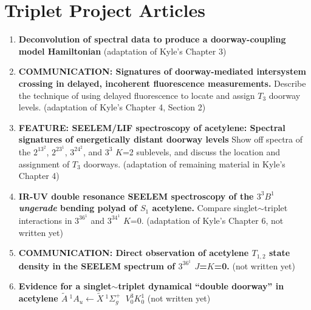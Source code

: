 \documentclass[12pt]{mitthesis}
\begin{document}
\newcommand{\mytitle}[1]{\textbf{#1}}
\newcommand{\AtoX}{$
  \tilde{A} \: ^1\!A_u 
  \leftarrow 
  \tilde{X} \: ^1\Sigma_g^+
  $}
\section*{Triplet Project Articles}
\begin{enumerate}
\item \mytitle{Deconvolution of spectral data to produce a
    doorway-coupling model Hamiltonian} (adaptation of Kyle's Chapter
  3)

\item \mytitle{COMMUNICATION: Signatures of doorway-mediated
    intersystem crossing in delayed, incoherent fluorescence
    measurements.}  Describe the technique of using delayed
  fluorescence to locate and assign $T_3$ doorway levels. (adaptation
  of Kyle's Chapter 4, Section 2)

\item \mytitle{FEATURE: SEELEM/LIF spectroscopy of acetylene: Spectral
    signatures of energetically distant doorway levels}  Show off
  spectra of the $2^13^2$, $2^23^1$, $3^24^2$, and $3^3$ $K$=2
  sublevels, and discuss the location and assignment of $T_3$
  doorways. (adaptation of remaining material in Kyle's Chapter 4)

\item \mytitle{IR-UV double resonance SEELEM spectroscopy of the
    $3^3B^1$ \emph{ungerade} bending polyad of $S_1$ acetylene.}
  Compare singlet$\sim$triplet interactions in $3^36^1$ and $3^34^1$
  $K$=0.  (adaptation of Kyle's Chapter 6, not written yet)

\item \mytitle{COMMUNICATION: Direct observation of acetylene
    $T_{1,2}$ state density in the SEELEM spectrum of $3^36^1$
    $J$=$K$=0.} (not written yet)

\item \mytitle{Evidence for a singlet$\sim$triplet dynamical ``double
    doorway'' in acetylene \AtoX\ $V^3_0K^1_0$} (not written yet)

\end{enumerate}
\end{document}
